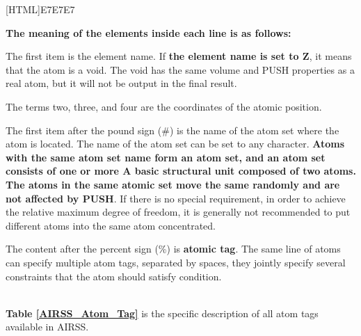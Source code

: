 \documentclass[a4paper, 10pt]{article}
\begin{document}
\noindent{}[HTML]{E7E7E7}{\parbox{\textwidth}{%
\noindent \textbf{The meaning of the elements inside each line is as follows: }
\begin{maineu}
  \item The first item is the element name. If \textbf{the element name is set to Z}, it means that the atom is a void. The void has the same volume and PUSH properties as a real atom, but it will not be output in the final result.
  \item The terms two, three, and four are the coordinates of the atomic position.
  \item The first item after the pound sign (\#) is the name of the atom set where the atom is located. The name of the atom set can be set to any character. \textbf{Atoms with the same atom set name form an atom set, and an atom set consists of one or more A basic structural unit composed of two atoms. The atoms in the same atomic set move the same randomly and are not affected by PUSH}. If there is no special requirement, in order to achieve the relative maximum degree of freedom, it is generally not recommended to put different atoms into the same atom concentrated.
  \item The content after the percent sign (\%) is \textbf{atomic tag}. The same line of atoms can specify multiple atom tags, separated by spaces, they jointly specify several constraints that the atom should satisfy condition.
\end{maineu}}}\\

\textbf{Table \ref{AIRSS_Atom_Tag}} is the specific description of all atom tags available in AIRSS.
\end{document}
